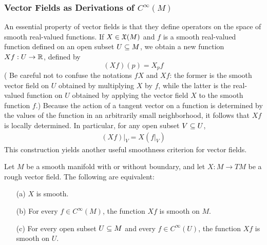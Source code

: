 \subsubsection{Vector Fields as Derivations of \boldmath$C^\infty(M)$}
An essential property of vector fields is that they define operators on the space of smooth real-valued functions. If $X\in\mathfrak{X}(M)$ and $f$ is a smooth real-valued function defined on an open subset $U\subseteq M$, we obtain a new function $Xf:U\to\mathbb{R}$, defined by
\[(Xf)(p)=X_pf\]
( Be careful not to confuse the notations $fX$ and $Xf$: the former is the smooth vector field on $U$ obtained by multiplying $X$ by $f$, while the latter is the real-valued function on $U$ obtained by applying the vector field $X$ to the smooth function $f$.) Because the action of a tangent vector on a function is determined by the values of the function in an arbitrarily small neighborhood, it follows that $Xf$ is locally determined. In particular, for any open subset $V\subseteq U$,
\begin{align}\label{vector deri local}
(Xf)|_V=X(f|_V)
\end{align}
This construction yields another useful smoothness criterion for vector fields.
\begin{proposition}\label{vector field smooth by function}
Let $M$ be a smooth manifold with or without boundary, and let $X:M\to TM$ be a rough vector field. The following are equivalent:
\begin{itemize}
\item[(a)] $X$ is smooth.
\item[(b)] For every $f\in C^\infty(M)$, the function $Xf$ is smooth on $M$.
\item[(c)] For every open subset $U\subseteq M$ and every $f\in C^\infty(U)$, the function $Xf$ is smooth on $U$.
\end{itemize}
\end{proposition}
